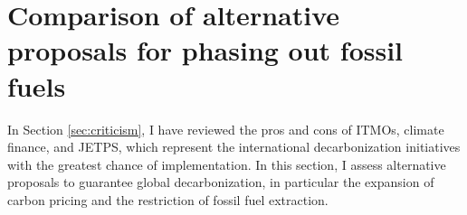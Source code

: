 \documentclass[12pt,english]{article}
\begin{document}
\section{Comparison of alternative proposals for phasing out fossil fuels}\label{sec:alternatives}%

In Section \ref{sec:criticism}, I have reviewed the pros and cons of ITMOs, climate finance, and JETPS, which represent the international decarbonization initiatives %
with the greatest chance of implementation. %
In this section, I assess alternative proposals to guarantee global decarbonization, in particular the expansion of carbon pricing and the restriction of fossil fuel extraction. %





\end{document}

